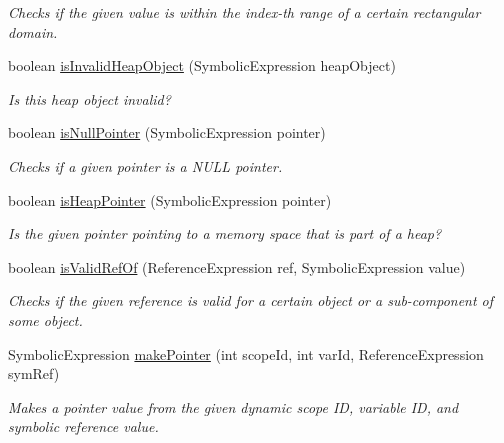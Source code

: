 \begin{DoxyCompactItemize}
\begin{DoxyCompactList}\small\item\em Checks if the given value is within the index-\/th range of a certain rectangular domain. \end{DoxyCompactList}\item 
boolean \hyperlink{classedu_1_1udel_1_1cis_1_1vsl_1_1civl_1_1dynamic_1_1common_1_1CommonSymbolicUtility_a960409c77023ce433a6087f1e464117a}{is\+Invalid\+Heap\+Object} (Symbolic\+Expression heap\+Object)
\begin{DoxyCompactList}\small\item\em Is this heap object invalid? \end{DoxyCompactList}\item 
boolean \hyperlink{classedu_1_1udel_1_1cis_1_1vsl_1_1civl_1_1dynamic_1_1common_1_1CommonSymbolicUtility_a4b68d3c1ff230f1380f20620f2058870}{is\+Null\+Pointer} (Symbolic\+Expression pointer)
\begin{DoxyCompactList}\small\item\em Checks if a given pointer is a N\+U\+L\+L pointer. \end{DoxyCompactList}\item 
boolean \hyperlink{classedu_1_1udel_1_1cis_1_1vsl_1_1civl_1_1dynamic_1_1common_1_1CommonSymbolicUtility_a330afce1fd252aaa5cc5c8975cbd288f}{is\+Heap\+Pointer} (Symbolic\+Expression pointer)
\begin{DoxyCompactList}\small\item\em Is the given pointer pointing to a memory space that is part of a heap? \end{DoxyCompactList}\item 
boolean \hyperlink{classedu_1_1udel_1_1cis_1_1vsl_1_1civl_1_1dynamic_1_1common_1_1CommonSymbolicUtility_a84ca8ded86813e4bb9b076baf640845d}{is\+Valid\+Ref\+Of} (Reference\+Expression ref, Symbolic\+Expression value)
\begin{DoxyCompactList}\small\item\em Checks if the given reference is valid for a certain object or a sub-\/component of some object. \end{DoxyCompactList}\item 
Symbolic\+Expression \hyperlink{classedu_1_1udel_1_1cis_1_1vsl_1_1civl_1_1dynamic_1_1common_1_1CommonSymbolicUtility_aaf5ab5e7044fd66d81b66ea566557ad9}{make\+Pointer} (int scope\+Id, int var\+Id, Reference\+Expression sym\+Ref)
\begin{DoxyCompactList}\small\item\em Makes a pointer value from the given dynamic scope I\+D, variable I\+D, and symbolic reference value. \end{DoxyCompactList}\item 

\end{DoxyCompactItemize}
